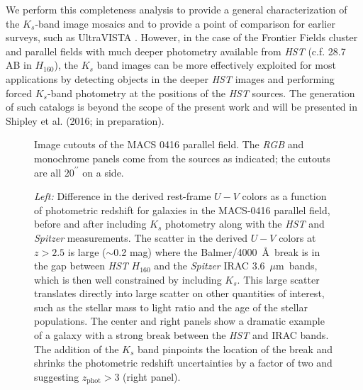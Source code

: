\documentclass[preprint2]{aastex6}
\gdef\mum{$\mu\mathrm{m}$}
\gdef\arcsec{^{\prime\prime}}
\begin{document}
We perform this completeness analysis to provide a general characterization of the $K_s$-band image mosaics and to provide a point of comparison for earlier surveys, such as UltraVISTA \citep{muzzin:13}.  However, in the case of the Frontier Fields cluster and parallel fields with much deeper photometry available from \textit{HST} (c.f. 28.7 AB in $H_{160}$), the $K_s$ band images can be more effectively exploited for most applications by detecting objects in the deeper \textit{HST} images and performing forced $K_s$-band photometry at the positions of the \textit{HST} sources.  The generation of such catalogs is beyond the scope of the present work and will be presented in Shipley et al. (2016; in preparation).

\begin{figure}[!ht]
\caption{Image cutouts of the MACS 0416 parallel field.  The \textit{RGB} and monochrome panels come from the sources as indicated; the cutouts are all $20\arcsec$ on a side.
\label{fig:cutout}}  
\end{figure}


\begin{figure*}
\caption{\textit{Left:} Difference in the derived rest-frame $U-V$ colors as a function of photometric redshift for galaxies in the MACS-0416 parallel field, before and after including $K_s$ photometry along with the \textit{HST} and \textit{Spitzer} measurements.  The scatter in the derived $U-V$ colors at $z>2.5$ is large ($\sim$0.2 mag) where the Balmer/4000~\AA\ break is in the gap between \textit{HST} $H_{160}$ and the \textit{Spitzer} IRAC 3.6~\mum\ bands, which is then well constrained by including $K_s$.  This large scatter translates directly into large scatter on other quantities of interest, such as the stellar mass to light ratio and the age of the stellar populations.  The center and right panels show a dramatic example of a galaxy with a strong break between the \textit{HST} and IRAC bands.  The addition of the $K_s$ band pinpoints the location of the break and shrinks the photometric redshift uncertainties by a factor of two and suggesting $z_\mathrm{phot} > 3$ (right panel). \label{fig:delta_UV}}  
\end{figure*}
\end{document}
